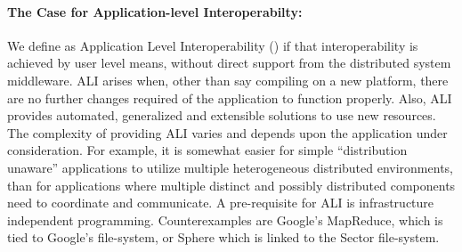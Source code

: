 \documentclass[3p,twocolumn]{elsarticle}
\begin{document}




\paragraph{The Case for Application-level Interoperabilty:}

We define as Application Level Interoperability () if that
interoperability is achieved by user level means, without direct support
from the distributed system middleware.  ALI arises when, other than say
compiling on a new platform, there are no further changes required of
the application to function properly.  Also, ALI provides automated,
generalized and extensible solutions to use new resources.
 The complexity of providing ALI varies and depends
upon the application under consideration.  For example, it is somewhat
easier for simple ``distribution unaware'' applications to utilize
multiple heterogeneous distributed environments, than for applications
where multiple distinct and possibly distributed components need to
coordinate and communicate.  A pre-requisite for ALI is infrastructure
independent programming.  Counterexamples are Google's MapReduce, which
is tied to Google's file-system, or Sphere \cite{sectorsphere09} which is
linked to the Sector file-system.
\end{document}
